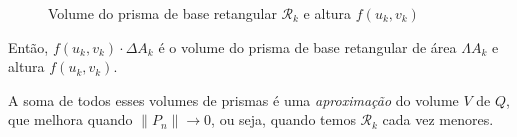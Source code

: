\begin{figure}[htbp]
            \caption{Volume do prisma de base retangular \(\mathcal{R}_k\) e altura \(f(u_k,v_k)\)}
            \label{fig:VolumePrisma}
        \end{figure}
Então, \(f(u_k,v_k)\cdot\Delta A_k\) é o volume do prisma de base retangular de área \(\Lambda A_k\) e altura \(f(u_k,v_k)\).

A soma de todos esses volumes de prismas é uma \textit{aproximação} do volume \(V\) de \(Q\), que melhora quando \(\|P_n\|\to 0\), ou seja, quando temos \(\mathcal{R}_k\) cada vez menores.

